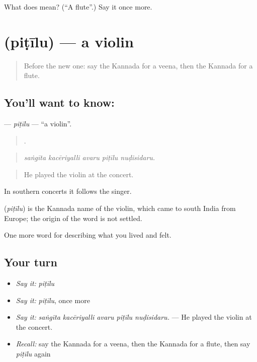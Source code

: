 \begin{tcolorbox}[breakable,colback=teal!4,colframe=teal!35!black,title={Before you move on}]
What does  mean? (\textquotedblleft{}A flute\textquotedblright{}.) Say it once more.
\end{tcolorbox}
\section[\texorpdfstring{\kn{ಪಿಟೀಲು} (piṭīlu)}{ಪಿಟೀಲು (piṭīlu)}]{ (piṭīlu) — a violin}

\label{lesson:KA-C535-pitilu}



\begin{quote}
Before the new one: say the Kannada for a veena, then the Kannada for a flute.
\end{quote}

\subsection*{You'll want to know: }
\textbf{} — \emph{piṭīlu} — \textquotedblleft{}a violin\textquotedblright{}.

\begin{quote}
    .
\end{quote}

\begin{quote}
\emph{saṅgīta kacēriyalli avaru piṭīlu nuḍisidaru.}
\end{quote}

\begin{quote}
He played the violin at the concert.
\end{quote}

In southern concerts it follows the singer.

\begin{cousinweb}
\textbf{} (\emph{piṭīlu}) is the Kannada name of the violin, which came to south India from Europe; the origin of the word is not settled.
\end{cousinweb}

\begin{grammarlens}[title={What you've built}]
One more word for describing what you lived and felt.
\end{grammarlens}

\subsection*{Your turn}
\begin{itemize}
\raggedright
  \item \emph{Say it:} \emph{piṭīlu}
  \item \emph{Say it:} \emph{piṭīlu}, once more
  \item \emph{Say it:} \emph{saṅgīta kacēriyalli avaru piṭīlu nuḍisidaru.} — He played the violin at the concert.
  \item \emph{Recall:} say the Kannada for a veena, then the Kannada for a flute, then say \emph{piṭīlu} again
\end{itemize}

